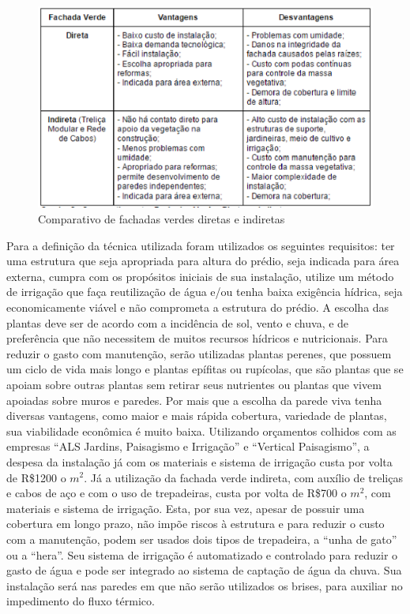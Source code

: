 \begin{figure}[!ht]
\centering
\includegraphics[keepaspectratio=true,scale=1]{figuras/comparativo_de_fachadas_verdes_diretas_e_indiretas.eps}
\caption{Comparativo de fachadas verdes diretas e indiretas}
\end{figure}

Para a definição da técnica utilizada foram utilizados os seguintes requisitos: ter uma estrutura que seja apropriada para altura do prédio, seja indicada para área externa, cumpra com os propósitos iniciais de sua instalação, utilize um método de irrigação que faça reutilização de água e/ou tenha baixa exigência hídrica, seja economicamente viável e não comprometa a estrutura do prédio.
A escolha das plantas deve ser de acordo com a incidência de sol, vento e chuva, e de preferência que não necessitem de muitos recursos hídricos e nutricionais. Para reduzir o gasto com manutenção, serão utilizadas plantas perenes, que possuem um ciclo de vida mais longo e plantas epífitas ou rupícolas, que são plantas que se apoiam sobre outras plantas sem retirar seus nutrientes ou plantas que vivem apoiadas sobre muros e paredes.
Por mais que a escolha da parede viva tenha diversas vantagens, como maior e mais rápida cobertura, variedade de plantas, sua viabilidade econômica é muito baixa. Utilizando orçamentos colhidos com as empresas “ALS Jardins, Paisagismo e Irrigação” e “Vertical Paisagismo”, a despesa da instalação já com os materiais e sistema de irrigação custa por volta de R\$1200 o $m^2$. Já a utilização da fachada verde indireta, com auxílio de treliças e cabos de aço e com o uso de trepadeiras, custa por volta de R\$700 o $m^2$, com materiais e sistema de irrigação. Esta, por sua vez, apesar de possuir uma cobertura em longo prazo, não impõe riscos à estrutura e para reduzir o custo com a manutenção, podem ser usados dois tipos de trepadeira, a “unha de gato” ou a “hera”. Seu sistema de irrigação é automatizado e controlado para reduzir o gasto de água e pode ser integrado ao sistema de captação de água da chuva. Sua instalação será nas paredes em que não serão utilizados os brises, para auxiliar no impedimento do fluxo térmico.

